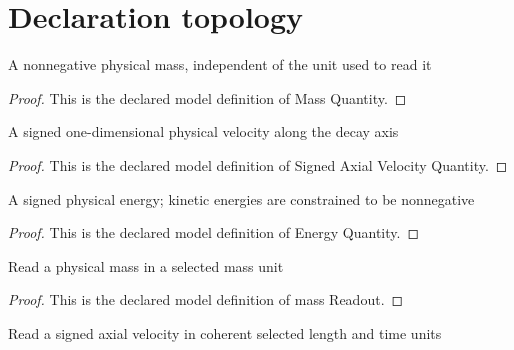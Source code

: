 \section{Declaration topology}
\begin{definition}
  \label{def:physics:phyx-mini-0551:phyxminiproblems-problemphyxmini0551-massquantity}
  A nonnegative physical mass, independent of the unit used to read it
\end{definition}
\begin{proof}
  This is the declared model definition of Mass Quantity.
\end{proof}
\begin{definition}
  \label{def:physics:phyx-mini-0551:phyxminiproblems-problemphyxmini0551-signedaxialvelocityquantity}
  A signed one-dimensional physical velocity along the decay axis
\end{definition}
\begin{proof}
  This is the declared model definition of Signed Axial Velocity Quantity.
\end{proof}
\begin{definition}
  \label{def:physics:phyx-mini-0551:phyxminiproblems-problemphyxmini0551-energyquantity}
  A signed physical energy; kinetic energies are constrained to be nonnegative
\end{definition}
\begin{proof}
  This is the declared model definition of Energy Quantity.
\end{proof}
\begin{definition}
  \label{def:physics:phyx-mini-0551:phyxminiproblems-problemphyxmini0551-massreadout}
  Read a physical mass in a selected mass unit
\end{definition}
\begin{proof}
  This is the declared model definition of mass Readout.
\end{proof}
\begin{definition}
  \label{def:physics:phyx-mini-0551:phyxminiproblems-problemphyxmini0551-velocityreadout}
  Read a signed axial velocity in coherent selected length and time units
\end{definition}
